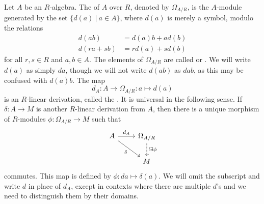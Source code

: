 Let $A$ be an $R$-algebra.
The  of $A$ over $R$,
denoted by $\Omega_{A/R}$,
is the $A$-module generated by the set $\{ d(a) ~|~ a \in A \}$,
where $d(a)$ is merely a symbol,
modulo the relations
\begin{align*}
  d(ab) &= d(a)b + ad(b) \\
  d(ra + sb) &= rd(a) + sd(b)
\end{align*}
for all $r, s \in R$ and $a, b \in A$.
The elements of $\Omega_{A/R}$ are called  or .
We will write $d(a)$ as simply $da$, though we will not write $d(ab)$ as $dab$, as this may be confused with $d(a)b$.
The map
  \[ d_A : A \to \Omega_{A/R} : a \mapsto d(a) \]
is an $R$-linear derivation, called the .
It is universal in the following sense.
If $\delta : A \to M$ is another $R$-linear derivation from $A$,
then there is a unique morphism of $R$-modules $\phi : \Omega_{A/R} \to M$ such that
\[ \begin{tikzcd}
  A \arrow{r}{d_A} \arrow[swap]{dr}{\delta} & \Omega_{A/R} \arrow[dashed]{d}{!\exists \phi} \\ & M
\end{tikzcd} \]
commutes.
This map is defined by $\phi : da \mapsto \delta(a)$.
We will omit the subscript and write $d$ in place of $d_A$,
except in contexts where there are multiple $d$'s and we need to distinguish them by their domains.

\begin{comment}
\begin{proposition}
  A morphism $\phi : A \to B$ of $R$-algebras induces
  a morphism $\psi : \Omega_{A/R} \to \Omega_{B/R}$ of $A$-modules.
\end{proposition}
\begin{proof}
  Let $\phi : A \to B$ be a morphism of $R$-algebras.
  We have the following maps,
  \[ \begin{tikzcd}
      A \arrow{r}{d_A} \arrow[swap]{d}{\phi} & \Omega_{A/R} \\ B \arrow[swap]{r}{d_B} & \Omega_{B/R}.
    \end{tikzcd} \]
  By Proposition \ref{prop_precompose_derivation},
  the composition $d_B \circ \phi : A \to \Omega_{B/R}$ is an $R$-linear derivation.
  By the universal property of the universal derivation,
  there is a unique map $\psi : \Omega_{A/R} \to \Omega_{B/R}$ such that
  \[ \begin{tikzcd}
      A \arrow{r}{d_A} \arrow[swap]{dr}{d_B \circ \phi} & \Omega_{A/R} \arrow[dashed]{d}{\psi} \\ & \Omega_{B/R}
    \end{tikzcd} \]
  commutes.
\end{proof}
The induced map sends $d_Aa \mapsto d_B(\phi(a))$.
\end{comment}

